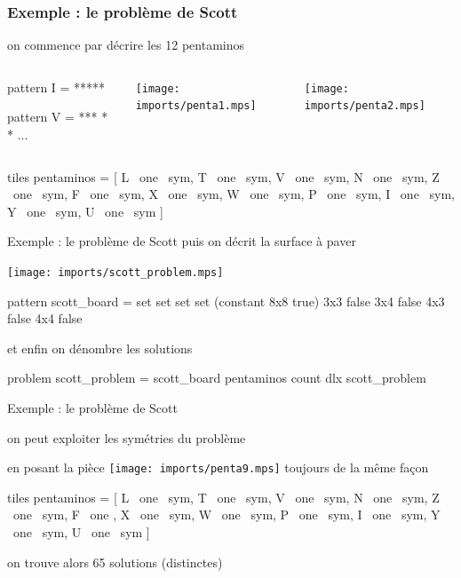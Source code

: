 \documentclass{beamer}
\begin{document}
\begin{frame}[fragile]\frametitle{Exemple : le problème de Scott}
  on commence par décrire les 12 pentaminos
  \begin{columns}
    \small
    \begin{combine}
  pattern I = {*****}

  pattern V = {
  ***
  *
  *
  }
  ...
    \end{combine}

  \texttt{[image: imports/penta1.mps]}

  \vspace{3em}

  \texttt{[image: imports/penta2.mps]}

  \vspace{5em}
  \end{columns}

\begin{combine}
tiles pentaminos =
  [ L ~one ~sym, T ~one ~sym, V ~one ~sym, N ~one ~sym,
    Z ~one ~sym, F ~one ~sym, X ~one ~sym, W ~one ~sym,
    P ~one ~sym, I ~one ~sym, Y ~one ~sym, U ~one ~sym ]
\end{combine}
\end{frame}

\begin{frame}[fragile]{Exemple : le problème de Scott}
  puis on décrit la surface à paver
  \begin{center}
    \texttt{[image: imports/scott\_problem.mps]}
  \end{center}
  \begin{combine}
  pattern scott_board =
    set set set set
      (constant 8x8 true)
      3x3 false 3x4 false 4x3 false 4x4 false
  \end{combine}

  et enfin on dénombre les solutions
  \begin{combine}
  problem scott_problem = scott_board pentaminos
  count dlx scott_problem
  \end{combine}

\end{frame}

\begin{frame}[fragile]{Exemple : le problème de Scott}


  on peut exploiter les symétries du problème

  en posant la pièce \texttt{[image: imports/penta9.mps]} toujours de
  la même façon

  \bigskip
\begin{combine}
tiles pentaminos =
  [ L ~one ~sym, T ~one ~sym, V ~one ~sym, N ~one ~sym,
    Z ~one ~sym, F ~one     , X ~one ~sym, W ~one ~sym,
    P ~one ~sym, I ~one ~sym, Y ~one ~sym, U ~one ~sym ]
\end{combine}

  \bigskip
  on trouve alors 65 solutions (distinctes)
\end{frame}
\end{document}
